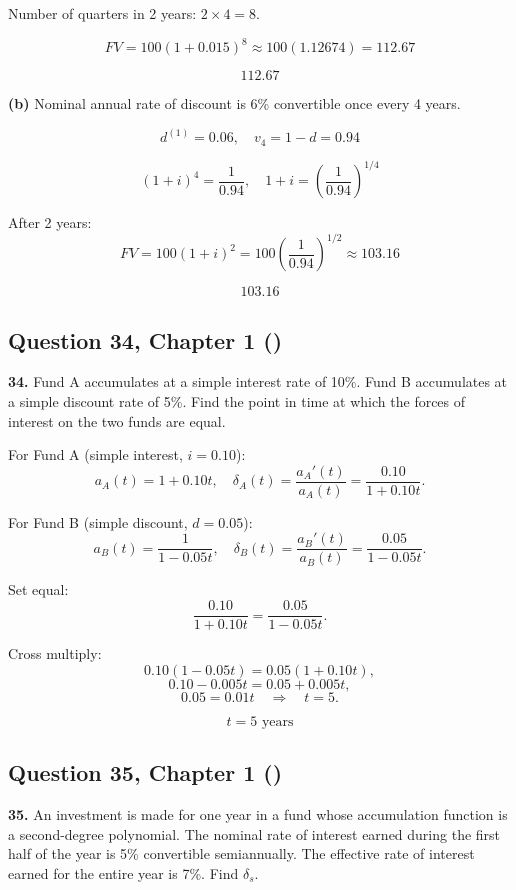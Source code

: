 \documentclass[12pt, a4paper]{article}
\begin{document}
Number of quarters in 2 years: \( 2 \times 4 = 8 \).  

\[
FV = 100(1+0.015)^8 \approx 100(1.12674) = 112.67
\]

\[
\boxed{112.67}
\]

\bigskip
\textbf{(b)} Nominal annual rate of discount is 6\% convertible once every 4 years.  

\[
d^{(1)} = 0.06, 
\quad v_4 = 1-d = 0.94
\]

\[
(1+i)^4 = \frac{1}{0.94}, 
\quad 1+i = \left(\frac{1}{0.94}\right)^{1/4}
\]

After 2 years:
\[
FV = 100 (1+i)^2 = 100 \left(\frac{1}{0.94}\right)^{1/2} \approx 103.16
\]

\[
\boxed{103.16}
\]

\subsection*{Question 34, Chapter 1  (\cite{toi3rd})}

\textbf{34.} Fund A accumulates at a simple interest rate of 10\%.  
Fund B accumulates at a simple discount rate of 5\%.  
Find the point in time at which the forces of interest on the two funds are equal.

\bigskip
For Fund A (simple interest, \(i = 0.10\)):  
\[
a_A(t) = 1 + 0.10t, 
\quad \delta_A(t) = \frac{a_A'(t)}{a_A(t)} 
= \frac{0.10}{1+0.10t}.
\]

For Fund B (simple discount, \(d = 0.05\)):  
\[
a_B(t) = \frac{1}{1-0.05t}, 
\quad \delta_B(t) = \frac{a_B'(t)}{a_B(t)} 
= \frac{0.05}{1-0.05t}.
\]

Set equal:
\[
\frac{0.10}{1+0.10t} = \frac{0.05}{1-0.05t}.
\]

Cross multiply:
\[
0.10(1-0.05t) = 0.05(1+0.10t),
\]
\[
0.10 - 0.005t = 0.05 + 0.005t,
\]
\[
0.05 = 0.01t \quad \Rightarrow \quad t = 5.
\]

\[
\boxed{t = 5 \text{ years}}
\]

\subsection*{Question 35, Chapter 1  (\cite{toi3rd})}

\textbf{35.} An investment is made for one year in a fund whose accumulation function 
is a second-degree polynomial. The nominal rate of interest earned during the first half 
of the year is 5\% convertible semiannually. The effective rate of interest earned for the entire year is 7\%. Find \(\delta_s\).
\end{document}
